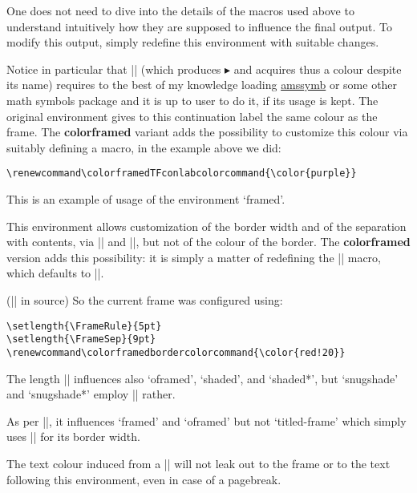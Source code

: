 \documentclass[a4paper,dvipdfmx,11pt]{article}
\def\colorframedTFconlabcolorcommand{\color{purple}}
\def\colorframedbordercolorcommand{\color{red!20}}
\def\ctanpackage#1{\href{https://ctan.org/pkg/#1}{#1}}
\newcommand\colorframed{%
        \texorpdfstring{{\color{joli}\bfseries colorframed}}{colorframed}\xspace}
\begin{document}
\begin{snugshade*}
\leavevmode\color{ForestGreen}
  One does not need to dive into the details of the macros
  used above to understand intuitively how they are supposed
  to influence the final output.  To modify this output,
  simply redefine this environment with suitable changes.

  Notice in particular that |\blacktriangleright|
  (which produces $\blacktriangleright$ and acquires thus a colour
  despite its name) requires to
  the best of my knowledge loading \ctanpackage{amssymb} or
  some other math symbols package and it is up to user to do it, if
  its usage is kept.
%
  The original environment gives to this continuation label the
  same colour as the frame.  The \colorframed variant adds the
  possibility to customize this colour via suitably defining a
  macro, in the example above we did:
\begin{verbatim}
\renewcommand\colorframedTFconlabcolorcommand{\color{purple}}
\end{verbatim}
\end{snugshade*}

\begin{framed}
  This is an example of usage of the environment `framed'.

  This environment allows customization of the border width
  and of the separation with contents, via |\FrameRule| and
  |\FrameSep|, but not of the colour of the border.  The
  \colorframed version adds this possibility: it is simply a
  matter of redefining the |\colorframedbordercolorcommand|
  macro, which defaults to |\normalcolor|.

\footnotesize (|\color{blue}| in source)
\normalsize
\color{blue}
  So the current frame was configured using:
\begin{verbatim}
\setlength{\FrameRule}{5pt}
\setlength{\FrameSep}{9pt}
\renewcommand\colorframedbordercolorcommand{\color{red!20}}
\end{verbatim}
\begin{footnotesize}\normalcolor
  The length |\FrameSep| influences also `oframed', `shaded', and `shaded*',
  but `snugshade' and `snugshade*' employ |\fboxsep| rather.

  As per |\FrameRule|, it influences `framed' and `oframed' but not
  `titled-frame' which simply uses |\fboxrule| for its border width.\par
\end{footnotesize}
  The text colour induced from a |\color{blue}|
  will not leak out to the frame or to the text following this
  environment, even in case of a pagebreak.
\end{framed}
\end{document}
